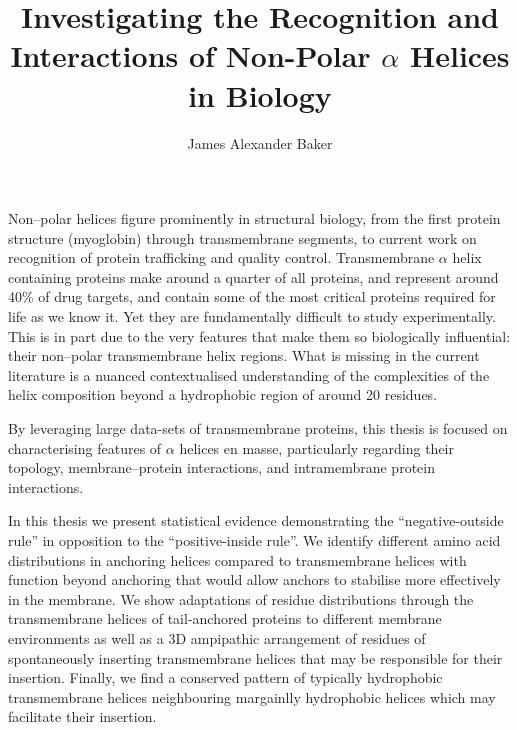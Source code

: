 \documentclass[12pt,PhD,twoside]{muthesis}
\begin{document}
\sloppy

\title{Investigating the Recognition and Interactions of Non-Polar \(\alpha\) Helices in Biology}
\author{James Alexander Baker}
\def\wordcount{22,000}






\beforeabstract{} %


Non\---polar helices figure prominently in structural biology, from the first protein structure (myoglobin) through transmembrane segments, to current work on recognition of protein trafficking and quality control.
Transmembrane \(\alpha\) helix containing proteins make around a quarter of all proteins, and represent around 40\% of drug targets, and contain some of the most critical proteins required for life as we know it.
Yet they are fundamentally difficult to study experimentally. This is in part due to the very features that make them so biologically influential: their non\---polar transmembrane helix regions.
What is missing in the current literature is a nuanced contextualised understanding of the complexities of the helix composition beyond a hydrophobic region of around 20 residues.

By leveraging large data-sets of transmembrane proteins, this thesis is focused on characterising features of \(\alpha\) helices en masse, particularly regarding their topology, membrane\---protein interactions, and intramembrane protein interactions.

In this thesis we present statistical evidence demonstrating the ``negative\--outside rule'' in opposition to the ``positive\--inside rule''.
We identify different amino acid distributions in anchoring helices compared to transmembrane helices with function beyond anchoring that would allow anchors to stabilise more effectively in the membrane.
We show adaptations of residue distributions through the transmembrane helices of tail\--anchored proteins to different membrane environments as well as a 3D ampipathic arrangement of residues of spontaneously inserting transmembrane helices that may be responsible for their insertion.
Finally, we find a conserved pattern of typically hydrophobic transmembrane helices neighbouring margainlly hydrophobic helices which may facilitate their insertion.
\end{document}
